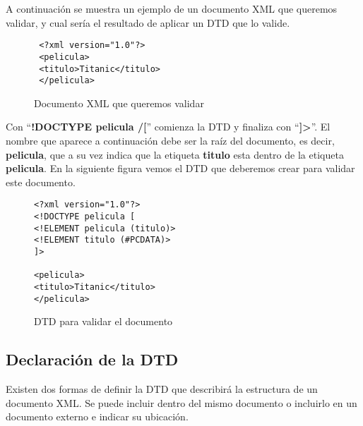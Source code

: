 A continuación se muestra un ejemplo de un documento XML que queremos validar, y cual sería el resultado de aplicar un DTD que lo valide.

\begin{figure}[h]
    \begin{tcolorbox}[sharp corners, colback=yellow!30, colframe=white!20]
        \scriptsize
        \begin{verbatim}
 <?xml version="1.0"?>
 <pelicula>
 <titulo>Titanic</titulo>
 </pelicula>
        \end{verbatim}
    \end{tcolorbox}
    \caption{Documento XML que queremos validar}
\end{figure}

Con ``\textbf{!DOCTYPE pelicula /[}'' comienza la DTD y finaliza con ``\textbf{]>}''. El nombre que aparece a continuación debe ser la raíz del documento, es decir, \textbf{pelicula}, que a su vez indica que la etiqueta \textbf{titulo} esta dentro de la etiqueta \textbf{pelicula}. En la siguiente figura vemos el DTD que deberemos crear para validar este documento.

\begin{figure}[h]
    \begin{tcolorbox}[sharp corners, colback=yellow!30, colframe=white!20]
        \scriptsize
        \begin{verbatim}
<?xml version="1.0"?>
<!DOCTYPE pelicula [
<!ELEMENT pelicula (titulo)>
<!ELEMENT titulo (#PCDATA)>
]>

<pelicula>
<titulo>Titanic</titulo>
</pelicula>
        \end{verbatim}
    \end{tcolorbox}
    \caption{DTD para validar el documento}
\end{figure}

\subsection{Declaración de la DTD}
Existen dos formas de definir la DTD que describirá la estructura de un documento XML. Se puede incluir dentro del mismo documento o incluirlo en un documento externo e indicar su ubicación.

